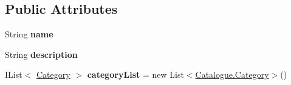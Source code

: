 \subsection*{Public Attributes}
\begin{DoxyCompactItemize}
\item 
\hypertarget{classcom_1_1shephertz_1_1app42_1_1paas_1_1sdk_1_1windows_1_1shopping_1_1_catalogue_a69b91a6517e0d675e05d97502c291480}{String {\bfseries name}}\label{classcom_1_1shephertz_1_1app42_1_1paas_1_1sdk_1_1windows_1_1shopping_1_1_catalogue_a69b91a6517e0d675e05d97502c291480}

\item 
\hypertarget{classcom_1_1shephertz_1_1app42_1_1paas_1_1sdk_1_1windows_1_1shopping_1_1_catalogue_a95f15f9030afe599cf75c0ee1c7f3115}{String {\bfseries description}}\label{classcom_1_1shephertz_1_1app42_1_1paas_1_1sdk_1_1windows_1_1shopping_1_1_catalogue_a95f15f9030afe599cf75c0ee1c7f3115}

\item 
\hypertarget{classcom_1_1shephertz_1_1app42_1_1paas_1_1sdk_1_1windows_1_1shopping_1_1_catalogue_a891c9e089ee883ca8e930032537c63cb}{I\+List$<$ \hyperlink{classcom_1_1shephertz_1_1app42_1_1paas_1_1sdk_1_1windows_1_1shopping_1_1_catalogue_1_1_category}{Category} $>$ {\bfseries category\+List} = new List$<$\hyperlink{classcom_1_1shephertz_1_1app42_1_1paas_1_1sdk_1_1windows_1_1shopping_1_1_catalogue_1_1_category}{Catalogue.\+Category}$>$()}\label{classcom_1_1shephertz_1_1app42_1_1paas_1_1sdk_1_1windows_1_1shopping_1_1_catalogue_a891c9e089ee883ca8e930032537c63cb}

\end{DoxyCompactItemize}
